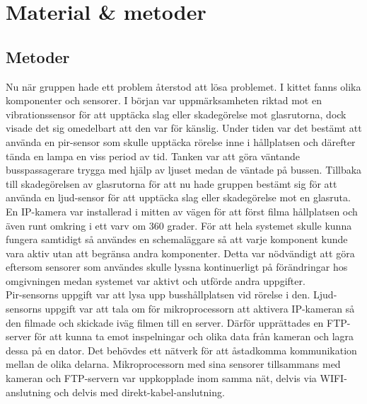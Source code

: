



\chapter{Material \& metoder} %
\label{ch:metoder}


\ifpdf
    \graphicspath{{8/figures/PNG/}{8/figures/PDF/}{8/figures/}}
\else
    \graphicspath{{8/figures/EPS/}{8/figures/}}
\fi




\section{Metoder}
Nu när gruppen hade ett problem återstod att lösa problemet. I kittet fanns olika komponenter och sensorer. I början var uppmärksamheten riktad mot en vibrationssensor för att upptäcka slag eller skadegörelse mot glasrutorna, dock visade det sig omedelbart att den var för känslig. Under tiden var det bestämt att använda en pir-sensor som skulle upptäcka rörelse inne i hållplatsen och därefter tända en lampa en viss period av tid. Tanken var att göra väntande busspassagerare trygga med hjälp av ljuset medan de väntade på bussen. Tillbaka till skadegörelsen av glasrutorna för att nu hade gruppen bestämt sig för att använda en ljud-sensor för att upptäcka slag eller skadegörelse mot en glasruta. En IP-kamera var installerad i mitten av vägen för att först filma hållplatsen och även runt omkring i ett varv om 360 grader. 
För att hela systemet skulle kunna fungera samtidigt så användes en schemaläggare så att varje komponent kunde vara aktiv utan att begränsa andra komponenter. Detta var nödvändigt att göra eftersom sensorer som användes skulle lyssna kontinuerligt på förändringar hos omgivningen medan systemet var aktivt och utförde andra uppgifter.\\

Pir-sensorns uppgift var att lysa upp busshållplatsen vid rörelse i den. Ljud-sensorns uppgift var att tala om för mikroprocessorn att aktivera IP-kameran så den filmade och skickade iväg filmen till en server. Därför upprättades en FTP-server för att kunna ta emot inspelningar och olika data från kameran och lagra dessa på en dator. Det behövdes ett nätverk för att åstadkomma kommunikation mellan de olika delarna. Mikroprocessorn med sina sensorer tillsammans med kameran och FTP-servern var uppkopplade inom samma nät, delvis via WIFI-anslutning och delvis med direkt-kabel-anslutning.

